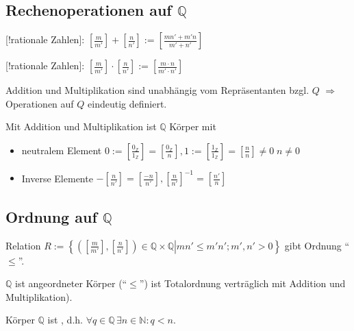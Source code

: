 \subsection*{Rechenoperationen auf $\mathbb{Q}$}
\begin{definition}
	[!rationale Zahlen]: $\left[ \frac{m}{m'}\right] + \left[ \frac{n}{n'}\right] := \left[ \frac{mn' + m'n}{m'+n'}\right]$
	
	[!rationale Zahlen]: $\left[\frac{m}{m'}\right]\cdot\left[\frac{n}{n'}\right]:=\left[\frac{m\cdot n}{m'\cdot n'}\right]$
	
	Addition und Multiplikation sind unabhängig vom Repräsentanten bzgl. $Q$ $\Rightarrow$ Operationen auf $Q$ eindeutig definiert.
\end{definition}

\begin{satz}
	Mit Addition und Multiplikation ist $\mathbb{Q}$ Körper mit
	\begin{itemize}
	\item neutralem Element $0:=\left[\frac{0_\mathbb{Z}}{1_\mathbb{Z}}\right] = \left[\frac{0_\mathbb{Z}}{n}\right], 1 :=\left[\frac{1_\mathbb{Z}}{1_\mathbb{Z}}\right] = \left[ \frac{n}{n}\right] \neq 0\;n\neq 0$
	\item Inverse Elemente $-\left[\frac{n}{n'}\right] = \left[ \frac{-n}{n'}\right], \left[\frac{n}{n'}\right]^{-1} = \left[\frac{n'}{n}\right]$
	\end{itemize}
\end{satz}

\subsection*{Ordnung auf $\mathbb{Q}$}
\begin{definition}
	Relation $R:=\left\lbrace \left. \left( \left[\frac{m}{m'}\right],\left[\frac{n}{n'}\right]\right)\in\mathbb{Q}\times\mathbb{Q} \right| mn'\le m'n'; m',n'>0\right\rbrace$ gibt Ordnung "`$\le$"'.
\end{definition}

\begin{satz}
	$\mathbb{Q}$ ist angeordneter Körper ("`$\leq$"') ist Totalordnung verträglich mit Addition und Multiplikation).
\end{satz}
\begin{conclusion}
	Körper $\mathbb{Q}$ ist , d.h. $\forall q\in\mathbb{Q} \, \exists n\in\mathbb{N}: q < n$.
\end{conclusion}